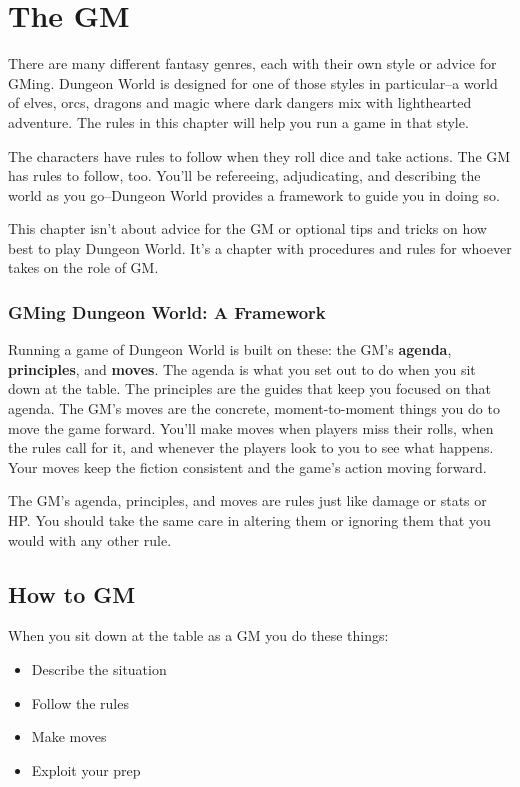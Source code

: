 \chapter{The GM}

There are many different fantasy genres, each with their own style or advice for GMing. Dungeon World is designed for one of those styles in particular--a world of elves, orcs, dragons and magic where dark dangers mix with lighthearted adventure. The rules in this chapter will help you run a game in that style.

The characters have rules to follow when they roll dice and take actions. The GM has rules to follow, too. You'll be refereeing, adjudicating, and describing the world as you go--Dungeon World provides a framework to guide you in doing so.

This chapter isn't about advice for the GM or optional tips and tricks on how best to play Dungeon World. It's a chapter with procedures and rules for whoever takes on the role of GM.
\subsection{GMing Dungeon World: A Framework}

Running a game of Dungeon World is built on these: the GM's \textbf{agenda}, \textbf{principles}, and \textbf{moves}. The agenda is what you set out to do when you sit down at the table. The principles are the guides that keep you focused on that agenda. The GM's moves are the concrete, moment-to-moment things you do to move the game forward. You'll make moves when players miss their rolls, when the rules call for it, and whenever the players look to you to see what happens. Your moves keep the fiction consistent and the game's action moving forward.

The GM's agenda, principles, and moves are rules just like damage or stats or HP\@. You should take the same care in altering them or ignoring them that you would with any other rule.
\section*{How to GM}

When you sit down at the table as a GM you do these things:
\begin{itemize}
\item Describe the situation
\item Follow the rules
\item Make moves
\item Exploit your prep

\end{itemize}

